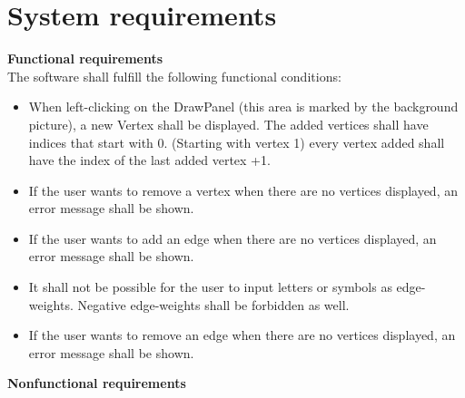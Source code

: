 \documentclass{article}
\begin{document}
\section{System requirements}
\textbf{Functional requirements} \\
The software shall fulfill the following functional conditions:
\begin{itemize}
\item When left-clicking on the DrawPanel (this area is marked by the background picture), a new Vertex shall be displayed. The added vertices shall have indices that start with 0. (Starting with vertex 1) every vertex added shall have the index of the last added vertex +1.
\item If the user wants to remove a vertex when there are no vertices displayed, an error message shall be shown.
\item If the user wants to add an edge when there are no vertices displayed, an error message shall be shown.
\item It shall not be possible for the user to input letters or symbols as edge-weights. Negative edge-weights shall be forbidden as well.
\item If the user wants to remove an edge when there are no vertices displayed, an error message shall be shown.

\end{itemize}  


\textbf{Nonfunctional requirements}
\end{document}
